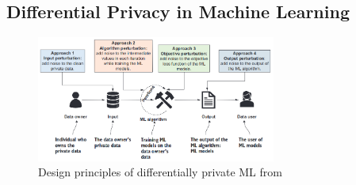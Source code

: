 \documentclass[aspectratio=169]{beamer}
\begin{document}


\subsection{Differential Privacy in Machine Learning}

\begin{frame}
    \begin{figure}[tb]
      \centering
      \includegraphics[width=0.7\textwidth]{Graphics/design_principles_dpml.png}
      \caption{Design principles of differentially private ML from \textcite{chang:2023}}
      \label{fig:design_principles_dpml_1}
    \end{figure}
\end{frame}
\end{document}
